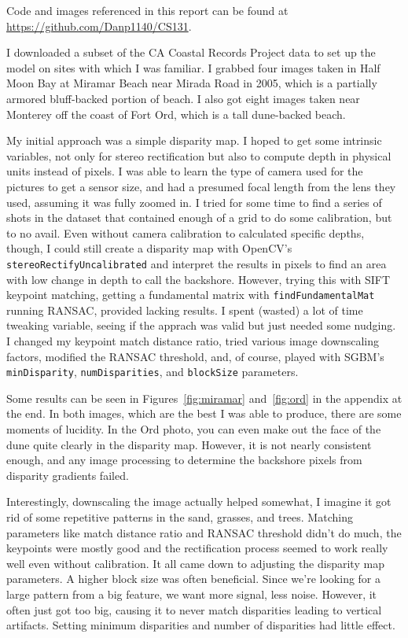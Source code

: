 \documentclass[a4paper, 11pt]{article}
\begin{document}
Code and images referenced in this report can be found at \url{https://github.com/Danp1140/CS131}.

I downloaded a subset of the CA Coastal Records Project data to set up the model on sites with which I was familiar.
I grabbed four images taken in Half Moon Bay at Miramar Beach near Mirada Road in 2005, which is a partially armored bluff-backed portion of beach.
I also got eight images taken near Monterey off the coast of Fort Ord, which is a tall dune-backed beach.

My initial approach was a simple disparity map.
I hoped to get some intrinsic variables, not only for stereo rectification but also to compute depth in physical units instead of pixels.
I was able to learn the type of camera used for the pictures to get a sensor size, and had a presumed focal length from the lens they used, assuming it was fully zoomed in.
I tried for some time to find a series of shots in the dataset that contained enough of a grid to do some calibration, but to no avail.
Even without camera calibration to calculated specific depths, though, I could still create a disparity map with OpenCV's \verb|stereoRectifyUncalibrated| and interpret the results in pixels to find an area with low change in depth to call the backshore.
However, trying this with SIFT keypoint matching, getting a fundamental matrix with \verb|findFundamentalMat| running RANSAC, provided lacking results.
I spent (wasted) a lot of time tweaking variable, seeing if the apprach was valid but just needed some nudging.
I changed my keypoint match distance ratio, tried various image downscaling factors, modified the RANSAC threshold, and, of course, played with SGBM's \verb|minDisparity|, \verb|numDisparities|, and \verb|blockSize| parameters.

Some results can be seen in Figures~\ref{fig:miramar} and~\ref{fig:ord} in the appendix at the end.
In both images, which are the best I was able to produce, there are some moments of lucidity.
In the Ord photo, you can even make out the face of the dune quite clearly in the disparity map.
However, it is not nearly consistent enough, and any image processing to determine the backshore pixels from disparity gradients failed.

Interestingly, downscaling the image actually helped somewhat, I imagine it got rid of some repetitive patterns in the sand, grasses, and trees.
Matching parameters like match distance ratio and RANSAC threshold didn't do much, the keypoints were mostly good and the rectification process seemed to work really well even without calibration.
It all came down to adjusting the disparity map parameters.
A higher block size was often beneficial. 
Since we're looking for a large pattern from a big feature, we want more signal, less noise.
However, it often just got too big, causing it to never match disparities leading to vertical artifacts.
Setting minimum disparities and number of disparities had little effect.
\end{document}
